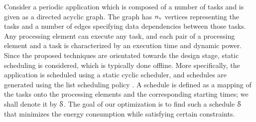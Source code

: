 Consider a periodic application which is composed of a number of tasks and is given as a directed acyclic graph.
The graph has ${n_\text{v}}$ vertices representing the tasks and a number of edges specifying data dependencies between those tasks.
Any processing element can execute any task, and each pair of a processing element and a task is characterized by an execution time and dynamic power.
Since the proposed techniques are orientated towards the design stage, static scheduling is considered, which is typically done offline.
More specifically, the application is scheduled using a static cyclic scheduler, and schedules are generated using the list scheduling policy \cite{adam1974}.
A schedule is defined as a mapping of the tasks onto the processing elements and the corresponding starting times; we shall denote it by $\EuScript{S}$.
The goal of our optimization is to find such a schedule $\EuScript{S}$ that minimizes the energy consumption while satisfying certain constraints.


